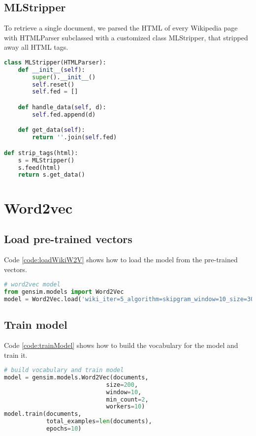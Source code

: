\subsection{MLStripper}
\label{appendix:MLStripper}
To retrieve a single document, we parsed the HTML of every Wikipedia page with HTMLParser subclassed with a customized class MLStripper, that stripped away all HTML tags.
\begin{lstlisting}[language=Python]
class MLStripper(HTMLParser):
    def __init__(self):
        super().__init__()
        self.reset()
        self.fed = []

    def handle_data(self, d):
        self.fed.append(d)

    def get_data(self):
        return ''.join(self.fed)

def strip_tags(html):
    s = MLStripper()
    s.feed(html)
    return s.get_data()

\end{lstlisting}

\section{Word2vec}

\subsection{Load pre-trained vectors}
\label{appendix:loadWikiW2V}
Code \ref{code:loadWikiW2V} shows how to load the model from the pre-trained vectors.
\begin{lstlisting}[caption={How to load Wikipedia pre-trained model}, label={code:loadWikiW2V}, language=Python, breaklines=true, frame=single] 
# word2vec model
from gensim.models import Word2Vec
model = Word2Vec.load('wiki_iter=5_algorithm=skipgram_window=10_size=300_neg-samples=10.m')
\end{lstlisting}

\subsection{Train model}
\label{appendix:trainModel}
\begin{minipage}{\linewidth}
Code \ref{code:trainModel} shows how to build the vocabulary for the model and train it.
\begin{lstlisting}[caption={How to build vocabulary and train model}, label={code:trainModel}, language=Python, breaklines=true, frame=single] 
# build vocabulary and train model
model = gensim.models.Word2Vec(documents,
                             size=200,
                             window=10,
                             min_count=2,
                             workers=10)
model.train(documents, 
            total_examples=len(documents),
            epochs=10)
\end{lstlisting}
\end{minipage}

